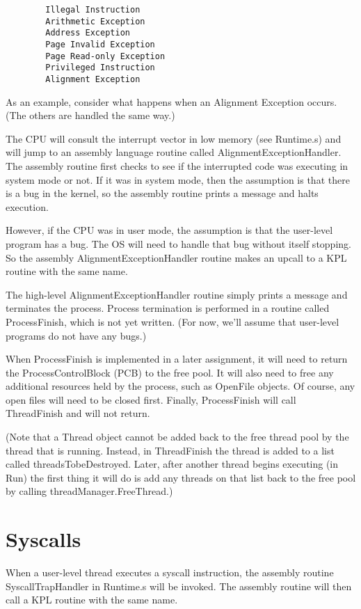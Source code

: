 \documentclass[12pt]{article}
\begin{document}
\begin{verbatim}
        Illegal Instruction
        Arithmetic Exception
        Address Exception
        Page Invalid Exception
        Page Read-only Exception
        Privileged Instruction
        Alignment Exception
\end{verbatim}

As an example, consider what happens when an Alignment Exception
occurs.  (The others are handled the same way.)

The CPU will consult the interrupt vector in low memory (see
Runtime.s) and will jump to an assembly language routine called
AlignmentExceptionHandler.  The assembly routine first checks to see
if the interrupted code was executing in system mode or not.  If it
was in system mode, then the assumption is that there is a bug in the
kernel, so the assembly routine prints a message and halts execution.

However, if the CPU was in user mode, the assumption is that the
user-level program has a bug.  The OS will need to handle that bug
without itself stopping.  So the assembly AlignmentExceptionHandler
routine makes an upcall to a KPL routine with the same name.

The high-level AlignmentExceptionHandler routine simply prints a
message and terminates the process.  Process termination is performed
in a routine called ProcessFinish, which is not yet written.  (For
now, we'll assume that user-level programs do not have any bugs.)

When ProcessFinish is implemented in a later assignment, it will need
to return the ProcessControlBlock (PCB) to the free pool.  It will
also need to free any additional resources held by the process, such
as OpenFile objects.  Of course, any open files will need to be closed
first.  Finally, ProcessFinish will call ThreadFinish and will not
return.

(Note that a Thread object cannot be added back to the free thread
pool by the thread that is running.  Instead, in ThreadFinish the
thread is added to a list called threadsTobeDestroyed.  Later, after
another thread begins executing (in Run) the first thing it will do is
add any threads on that list back to the free pool by calling
threadManager.FreeThread.)

\section{Syscalls}

When a user-level thread executes a syscall instruction, the assembly
routine SyscallTrapHandler in Runtime.s will be invoked.  The assembly
routine will then call a KPL routine with the same name.
\end{document}
